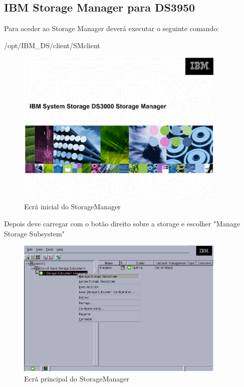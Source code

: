 \subsection{IBM Storage Manager para DS3950}

Para aceder ao Storage Manager deverá executar o seguinte comando:

/opt/IBM\_DS/client/SMclient


\begin{figure}[H]
    \begin{center}
        \includegraphics[width=10cm]{include/img/ds3400_1}
    \end{center}
    \caption{Ecrã inicial do StorageManager}
    \label{fig:ds3400-1}
\end{figure}

Depois deve carregar com o botão direito sobre a storage e escolher "Manage Storage Subsystem"

\begin{figure}[H]
    \begin{center}
        \includegraphics[width=10cm]{include/img/ds3400_2}
    \end{center}
    \caption{Ecrã principal do StorageManager}
    \label{fig:ds3400-2}
\end{figure}

